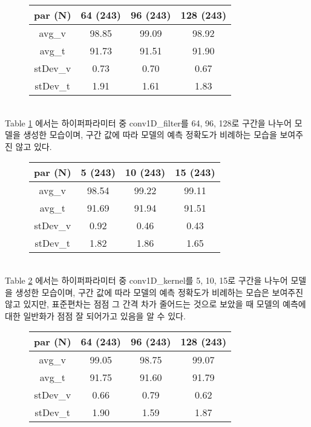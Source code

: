 \documentclass{jcse}
\begin{document}
\begin{figure}[ht]
\begin{minipage}{\linewidth}
\centering
{}
\label{tab:Conv1D_filter}
\begin{tabular}{cccc}
\hline
par (N) & 64 (243) & 96 (243) & 128 (243) \\
\hline
avg\_v  & 98.85 & 99.09 & 98.92  \\
avg\_t  & 91.73 & 91.51 & 91.90  \\
stDev\_v & 0.73 & 0.70 & 0.67 \\
stDev\_t & 1.91 & 1.61 & 1.83 \\
\hline
\end{tabular}
\end{minipage}
\end{figure}
\\Table \ref{tab:Conv1D_filter} 에서는 하이퍼파라미터 중 conv1D\_filter를 64, 96, 128로 구간을 나누어 모델을 생성한 모습이며, 구간 값에 따라 모델의 예측 정확도가 비례하는 모습을 보여주진 않고 있다.
\\
\begin{figure}[ht]
\begin{minipage}{\linewidth}
\centering
{}
\label{tab:Conv1D_kernel}
\begin{tabular}{cccc}
\hline
par (N) & 5 (243) & 10 (243) & 15 (243) \\
\hline
avg\_v  & 98.54 & 99.22 & 99.11  \\
avg\_t  & 91.69 & 91.94 & 91.51  \\
stDev\_v & 0.92 & 0.46 & 0.43 \\
stDev\_t & 1.82 & 1.86 & 1.65 \\
\hline
\end{tabular}
\end{minipage}
\end{figure}
\\Table \ref{tab:Conv1D_kernel} 에서는 하이퍼파라미터 중 conv1D\_kernel를 5, 10, 15로 구간을 나누어 모델을 생성한 모습이며, 구간 값에 따라 모델의 예측 정확도가 비례하는 모습은 보여주진 않고 있지만, 표준편차는 점점 그 간격 차가 줄어드는 것으로 보았을 때 모델의 예측에 대한 일반화가 점점 잘 되어가고 있음을 알 수 있다.
\\
\begin{figure}[ht]
\begin{minipage}{\linewidth}
\centering
{}
\label{tab:density}
\begin{tabular}{cccc}
\hline
par (N) & 64 (243) & 96 (243) & 128 (243) \\
\hline
avg\_v  & 99.05 & 98.75 & 99.07  \\
avg\_t  & 91.75 & 91.60 & 91.79  \\
stDev\_v & 0.66 & 0.79 & 0.62 \\
stDev\_t & 1.90 & 1.59 & 1.87 \\
\hline
\end{tabular}
\end{minipage}
\end{figure}
\end{document}
